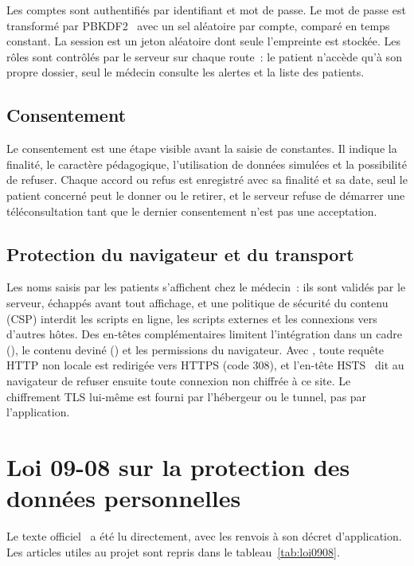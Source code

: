 Les comptes sont authentifiés par identifiant et mot de passe. Le mot de passe est transformé par \ac{PBKDF2}~\cite{rfc8018} avec un sel aléatoire par compte, comparé en temps constant. La session est un jeton aléatoire dont seule l'empreinte est stockée. Les rôles sont contrôlés par le serveur sur chaque route~: le patient n'accède qu'à son propre dossier, seul le médecin consulte les alertes et la liste des patients.

\subsection{Consentement}

Le consentement est une étape visible avant la saisie de constantes. Il indique la finalité, le caractère pédagogique, l'utilisation de données simulées et la possibilité de refuser. Chaque accord ou refus est enregistré avec sa finalité et sa date, seul le patient concerné peut le donner ou le retirer, et le serveur refuse de démarrer une téléconsultation tant que le dernier consentement n'est pas une acceptation.

\subsection{Protection du navigateur et du transport}

Les noms saisis par les patients s'affichent chez le médecin~: ils sont validés par le serveur, échappés avant tout affichage, et une politique de sécurité du contenu (\ac{CSP}) interdit les scripts en ligne, les scripts externes et les connexions vers d'autres hôtes. Des en-têtes complémentaires limitent l'intégration dans un cadre (), le contenu deviné () et les permissions du navigateur. Avec , toute requête HTTP non locale est redirigée vers HTTPS (code 308), et l'en-tête \ac{HSTS}~\cite{rfc6797} dit au navigateur de refuser ensuite toute connexion non chiffrée à ce site. Le chiffrement \ac{TLS} lui-même est fourni par l'hébergeur ou le tunnel, pas par l'application.

\section{Loi 09-08 sur la protection des données personnelles}

Le texte officiel~\cite{loi0908} a été lu directement, avec les renvois à son décret d'application. Les articles utiles au projet sont repris dans le tableau~\ref{tab:loi0908}.

